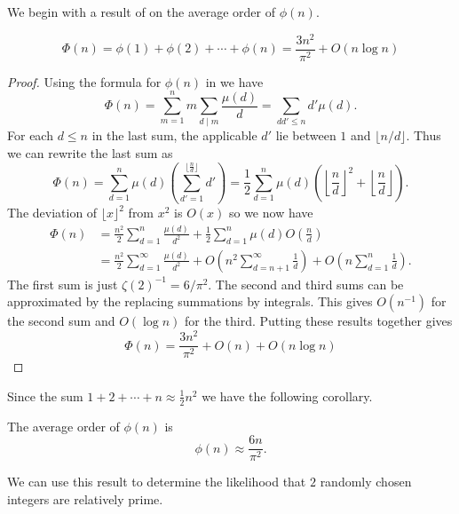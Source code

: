 \medskip
We begin with a result of {\Mertens} \cite{Mertens74} on the average
order of $\phi(n)$.

\begin{proposition}[Mertens]
\label{Mertens:phi:Prop}
\[
\Phi(n) = \phi(1) + \phi(2) + \cdots + \phi(n) =
\frac{3 n^2}{\pi^2} + O(n \log n)
\]
\end{proposition}

\begin{proof}
Using the formula for $\phi(n)$ in  we have
\[
\Phi(n) = \sum_{m=1}^{n} m \sum_{d\mid m}\frac{\mu(d)}{d} =
\sum_{d d' \le n} d' \mu(d).
\]
For each $d \le n$ in the last sum, the applicable $d'$ lie
between $1$ and $\lfloor n/d\rfloor$.  Thus we can rewrite the
last sum as
\[
\Phi(n) = \sum_{d=1}^{n} \mu(d)
\left(\sum_{d'=1}^{\lfloor\frac{n}{d}\rfloor} d'\right) =
\frac{1}{2}\sum_{d=1}^{n} \mu(d)
\left(\left\lfloor\frac{n}{d}\right\rfloor^2 +
    \left\lfloor\frac{n}{d}\right\rfloor\right).
\]
The deviation of $\lfloor x\rfloor^2$ from $x^2$ is $O(x)$ so we now have
\[
\begin{aligned}
  \Phi(n) &= \frac{n^2}{2}\sum_{d=1}^{n}\frac{\mu(d)}{d^2} + 
    \frac{1}{2} \sum_{d=1}^{n} \mu(d) O(\frac{n}{d}) \\
  & = \frac{n^2}{2}\sum_{d=1}^{\infty}\frac{\mu(d)}{d^2} +
    O\left(n^2 \sum_{d=n+1}^{\infty} \frac{1}{d}\right) +
    O\left(n \sum_{d=1}^{n} \frac{1}{d}\right).
\end{aligned}
\]
The first sum is just $\zeta(2)^{-1} = 6/\pi^2$.  The second and
third sums can be approximated by the replacing summations by
integrals.  This gives $O(n^{-1})$ for the second sum and $O(\log n)$
for the third.  Putting these results together gives
\[
\Phi(n) = \frac{3 n^2}{\pi^2} + O(n) + O(n \log n)
\]
\end{proof}

Since the sum $1 + 2 + \cdots + n \approx \frac{1}{2} n^2$ we have the
following corollary.

\begin{proposition}\label{Totient:Average:Prop}
The average order of $\phi(n)$ is 
\[
\phi(n) \approx \frac{6n}{\pi^2}.
\]
\end{proposition}

We can use this result to determine the likelihood that $2$ randomly
chosen integers are relatively prime.  

